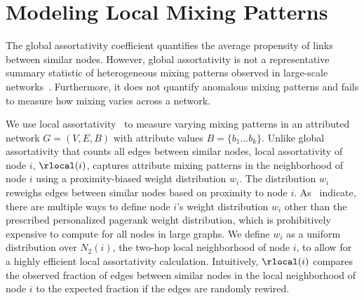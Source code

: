 \section{Modeling Local Mixing Patterns}
\label{subsec:LocalMixing}

The global assortativity coefficient quantifies
the average propensity of links between similar nodes.
However, global assortativity is not a representative summary statistic of
heterogeneous mixing patterns observed in large-scale networks~\cite{peel2018multiscale}.
Furthermore, it does not quantify anomalous mixing patterns and fails to measure how mixing varies across a network.

We use local assortativity~\cite{peel2018multiscale} to measure varying
mixing patterns in an attributed network $G=(V,E,B)$ with attribute values $B=\{b_1...b_k\}$.
Unlike global assortativity that counts all edges between similar nodes, local assortativity
of node $i$, $\rlocal(i)$, captures attribute mixing patterns in the neighborhood of node
$i$ using a proximity-biased weight distribution $w_i$. The distribution
$w_i$ reweighs edges between similar nodes based on proximity to
node $i$. As~\citet{peel2018multiscale} indicate, there are multiple ways
to define node $i$'s weight distribution $w_i$ other than the prescribed
personalized pagerank weight distribution, which is prohibitively expensive to compute
for all nodes in large graphs.
We define $w_i$ as a uniform distribution over $N_2(i)$, the two-hop local neighborhood
of node $i$, to allow for a highly efficient
local assortativity calculation.
Intuitively, $\rlocal(i)$ compares the observed fraction of edges between similar nodes
in the local neighborhood of node $i$ to the expected fraction
if the edges are randomly rewired.

